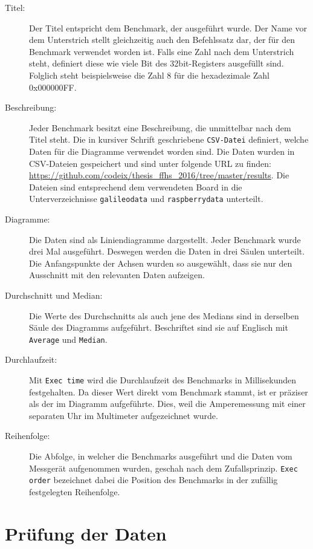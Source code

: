 \begin{description}
\item[Titel:]
Der Titel entspricht dem Benchmark, der ausgeführt wurde. Der Name vor dem Unterstrich stellt gleichzeitig auch den Befehlssatz dar, der für den Benchmark verwendet worden ist. Falls eine Zahl nach dem Unterstrich steht, definiert diese wie viele Bit des 32bit-Registers ausgefüllt sind. Folglich steht beispielsweise die Zahl 8 für die hexadezimale Zahl 0x000000FF.
\item[Beschreibung:]
Jeder Benchmark besitzt eine Beschreibung, die unmittelbar nach dem Titel steht. Die in kursiver Schrift geschriebene \texttt{CSV-Datei} definiert, welche Daten für die Diagramme verwendet worden sind. Die Daten wurden in CSV-Dateien gespeichert und sind unter folgende URL zu finden: \url{https://github.com/codeix/thesis_ffhs_2016/tree/master/results}. Die Dateien sind entsprechend dem verwendeten Board in die Unterverzeichnisse \texttt{galileodata} und \texttt{raspberrydata} unterteilt. 
\item[Diagramme:]
Die Daten sind als Liniendiagramme dargestellt. Jeder Benchmark wurde drei Mal ausgeführt. Deswegen werden die Daten in drei Säulen unterteilt. Die Anfangspunkte der Achsen wurden so ausgewählt, dass sie nur den Ausschnitt mit den relevanten Daten aufzeigen.
\item[Durchschnitt und Median:]
Die Werte des Durchschnitts als auch jene des Medians sind in derselben Säule des Diagramms aufgeführt. Beschriftet sind sie auf Englisch mit \texttt{Average} und \texttt{Median}.
\item[Durchlaufzeit:]
Mit \texttt{Exec time} wird die Durchlaufzeit des Benchmarks in Millisekunden festgehalten. Da dieser Wert direkt vom Benchmark stammt, ist er präziser als der im Diagramm aufgeführte. Dies, weil die Amperemessung mit einer separaten Uhr im Multimeter aufgezeichnet wurde.
\item[Reihenfolge:] Die Abfolge, in welcher die Benchmarks ausgeführt und die Daten vom Messgerät aufgenommen wurden, geschah nach dem Zufallsprinzip. \texttt{Exec order} bezeichnet dabei die Position des Benchmarks in der zufällig festgelegten Reihenfolge.

\end{description}



\section{Prüfung der Daten}

